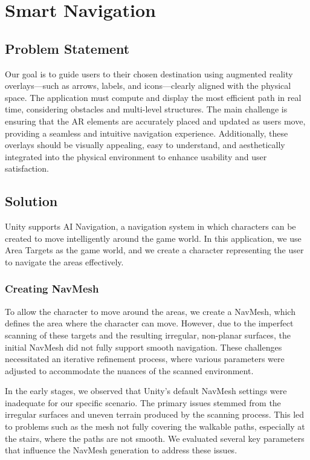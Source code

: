 \section{Smart Navigation}
\subsection{Problem Statement}
Our goal is to guide users to their chosen destination using augmented reality overlays—such as arrows, labels, and icons—clearly aligned with the physical space. The application must compute and display the most efficient path in real time, considering obstacles and multi-level structures. The main challenge is ensuring that the AR elements are accurately placed and updated as users move, providing a seamless and intuitive navigation experience. Additionally, these overlays should be visually appealing, easy to understand, and aesthetically integrated into the physical environment to enhance usability and user satisfaction.

\subsection{Solution}
Unity supports AI Navigation, a navigation system in which characters can be created to move intelligently around the game world. In this application, we use Area Targets as the game world, and we create a character representing the user to navigate the areas effectively.

\subsubsection{Creating NavMesh}
To allow the character to move around the areas, we create a NavMesh, which defines the area where the character can move. However, due to the imperfect scanning of these targets and the resulting irregular, non-planar surfaces, the initial NavMesh did not fully support smooth navigation. These challenges necessitated an iterative refinement process, where various parameters were adjusted to accommodate the nuances of the scanned environment.

In the early stages, we observed that Unity's default NavMesh settings were inadequate for our specific scenario. The primary issues stemmed from the irregular surfaces and uneven terrain produced by the scanning process. This led to problems such as the mesh not fully covering the walkable paths, especially at the stairs, where the paths are not smooth. We evaluated several key parameters that influence the NavMesh generation to address these issues.

